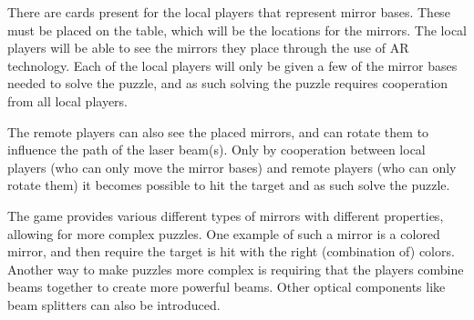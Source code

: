 		There are cards present for the local players that represent mirror 
		bases. These must be placed on the table, which will be the locations 
		for the mirrors. The local players will be able to see the mirrors they 
		place through the use of AR technology. Each of the local players will 
		only be given a few of the mirror bases needed to solve the puzzle, and 
		as such solving the puzzle requires cooperation from all local players.
		
		The remote players can also see the placed mirrors, and can rotate them 
		to influence the path of the laser beam(s). Only by cooperation between 
		local players (who can only move the mirror bases) and remote players 
		(who can only rotate them) it becomes possible to hit the target and as 
		such solve the puzzle.
		
		The game provides various different types of mirrors with different 
		properties, allowing for more complex puzzles. One example of such a 
		mirror is a colored mirror, and then require the target is hit with the 
		right (combination of) colors. Another way to make puzzles more complex 
		is requiring that the players combine beams together to create more 
		powerful beams. Other optical components like beam splitters can also be 
		introduced.
		
